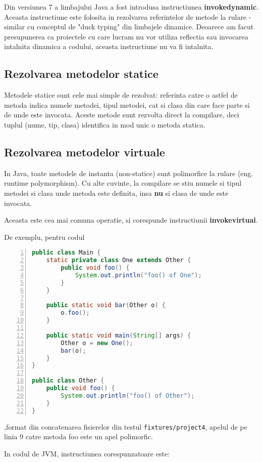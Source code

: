 Din versiunea 7 a limbajului Java a fost introdusa instructiunea
\textbf{invokedynamic}.
Aceasta instructiune este folosita in rezolvarea referintelor de metode la
rulare - similar cu conceptul de "duck typing" din limbajele dinamice.
Deoarece am facut presupunerea ca proiectele cu care lucram nu vor utiliza
reflectia sau invocarea intalnita dinamica a codului, aceasta instructiune nu va
fi intalnita.

\subsection{Rezolvarea metodelor statice}

Metodele statice sunt cele mai simple de rezolvat: referinta catre o astfel de
metoda indica numele metodei, tipul metodei, cat si clasa din care face parte si
de unde este invocata.
Aceste metode sunt rezvolta direct la compilare, deci tuplul (nume, tip, clasa)
identifica in mod unic o metoda statica.

\subsection{Rezolvarea metodelor virtuale}

In Java, toate metodele de instanta (non-statice) sunt polimorfice la rulare
(eng. runtime polymorphism).
Cu alte cuvinte, la compilare se stiu numele si tipul metodei si clasa unde
metoda este definita, insa \textbf{nu} si clasa de unde este invocata.

Aceasta este cea mai comuna operatie, si corespunde instructiunii
\textbf{invokevirtual}.

De exemplu, pentru codul
\begin{lstlisting}[language=Java, numbers=left]
public class Main {
    static private class One extends Other {
        public void foo() {
            System.out.println("foo() of One");
        }
    }

    public static void bar(Other o) {
        o.foo();
    }

    public static void main(String[] args) {
        Other o = new One();
        bar(o);
    }
}

public class Other {
    public void foo() {
        System.out.println("foo() of Other");
    }
}
\end{lstlisting}
,format din concatenarea fisierelor din testul \texttt{fixtures/project4},
apelul de pe linia 9 catre metoda foo este un apel polimorfic.

In codul de JVM, instructiunea corespunzatoare este:

